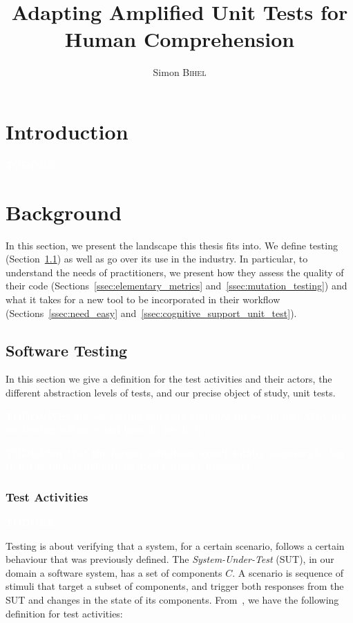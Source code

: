 \documentclass[11pt]{sdm_internship}
\title{Adapting Amplified Unit Tests for Human Comprehension}
\author{Simon \textsc{Bihel}}
\newcommand{\todo}[1]{\colorbox{Red!75}{\textcolor{white}{\textbf{TODO\ifx&#1&\else: #1\fi}}}}
\theoremstyle{definition}
\begin{document}
\maketitle

\section*{Introduction}%
\label{sec:intro}%
\todo{}


\section{Background}%
\label{sec:background}
In this section, we present the landscape this thesis fits into.
We define testing (Section~\ref{ssec:software_testing}) as well as go over its use in the industry.
In particular, to understand the needs of practitioners, we present how they assess the quality of their code (Sections~\ref{ssec:elementary_metrics} and~\ref{ssec:mutation_testing}) and what it takes for a new tool to be incorporated in their workflow (Sections~\ref{ssec:need_easy} and~\ref{ssec:cognitive_support_unit_test}).

\subsection{Software Testing}%
\label{ssec:software_testing}
In this section we give a definition for the test activities and their actors, the different abstraction levels of tests, and our precise object of study, unit tests.

\todo{Why are we testing software and how do we do it}

\todo{Say that the formal definitions aren't totally necessary}

\subsubsection{Test Activities}%
\label{sssec:test_activities}
\todo{}

Testing is about verifying that a system, for a certain scenario, follows a certain behaviour that was previously defined.
The \emph{System-Under-Test} (SUT), in our domain a software system, has a set of components $C$.
A scenario is sequence of stimuli that target a subset of components, and trigger both responses from the SUT and changes in the state of its components.
From~\cite{barr2015oracle}, we have the following definition for test activities:
\end{document}
